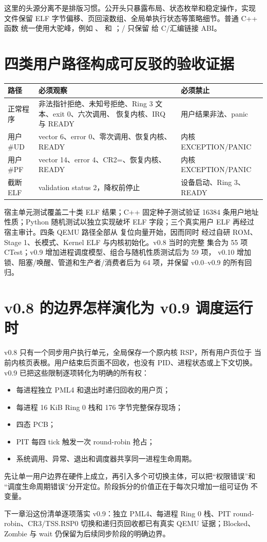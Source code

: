 这里的头源分离不是排版习惯。公开头只暴露布局、状态枚举和稳定操作，实现
文件保留 ELF 字节偏移、页回滚数组、全局单执行状态等策略细节。普通 C++ 函数
统一使用大驼峰，例如 、
和 ；/ 只保留
给 C/汇编链接 ABI。

\section{四类用户路径构成可反驳的验收证据}

\begin{longtable}{L{0.18\textwidth}L{0.34\textwidth}L{0.34\textwidth}}
\toprule
路径 & 必须观察 & 必须禁止\\
\midrule
正常程序 & 非法指针拒绝、未知号拒绝、Ring 3 文本、exit 0、六次调用、
恢复内核、IRQ 与 READY & 用户结果非法、panic\\
用户 \#UD & vector 6、error 0、零次调用、恢复内核、READY &
内核 EXCEPTION/PANIC\\
用户 \#PF & vector 14、error 4、CR2=、恢复内核、
READY & 内核 EXCEPTION/PANIC\\
截断 ELF & validation status 2，降权前停止 & 设备启动、Ring 3、READY\\
\bottomrule
\end{longtable}

宿主单元测试覆盖二十类 ELF 结果；C++ 固定种子测试验证 16384 条用户地址
性质；Python 随机测试以独立实现破坏 ELF 字段；三个真实用户 ELF 再经过
宿主审计。四条 QEMU 路径全部从  复位向量开始，因而同时
经过自研 ROM、Stage 1、长模式、Kernel ELF 与内核初始化。v0.8 当时的完整
集合为 55 项 CTest；v0.9 增加进程调度模型、组合与随机性质测试后为 59 项，
v0.10 增加锁、阻塞/唤醒、管道和生产者/消费者后为 64 项，并保留
v0.0--v0.9 的所有回归。

\section{v0.8 的边界怎样演化为 v0.9 调度运行时}

v0.8 只有一个同步用户执行单元，全局保存一个原内核 RSP，所有用户页位于
当前内核页表根。用户结束后页面不回收，也没有 PID、进程状态或上下文切换。
v0.9 已把这些限制逐项转化为明确的所有权：

\begin{itemize}
  \item 每进程独立 PML4 和退出时递归回收的用户页；
  \item 每进程 16 KiB Ring 0 栈和 176 字节完整保存现场；
  \item {} 四态 PCB；
  \item PIT 每四 tick 触发一次 round-robin 抢占；
  \item 系统调用、异常、退出和调度器共享同一进程生命周期。
\end{itemize}

先让单一用户边界在硬件上成立，再引入多个可切换主体，可以把“权限错误”和
“调度生命周期错误”分开定位。阶段拆分的价值正在于每次只增加一组可证伪
不变量。

下一章沿这份清单逐项落实 v0.9：独立 PML4、每进程 Ring 0 栈、PIT
round-robin、CR3/TSS.RSP0 切换和递归页回收都已有真实 QEMU 证据；Blocked、
Zombie 与 wait 仍保留为后续同步阶段的明确边界。
